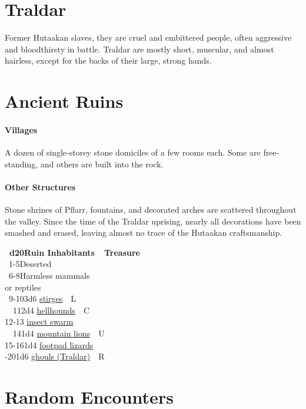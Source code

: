 \documentclass[english,11pt,openany,letterpaper,twocolumn]{book}
\begin{document}
\section{Traldar}

Former Hutaakan slaves, they are cruel and embittered people, often aggressive and bloodthirsty in battle. Traldar are mostly short, muscular, and almost hairless, except for the backs of their large, strong hands.

\section{Ancient Ruins}

\paragraph{Villages}

A dozen of single-storey stone domiciles of a few rooms each. Some are free-standing, and others are built into the rock.

\paragraph{Other Structures}
Stone shrines of Pflarr, fountains, and decorated arches are scattered throughout the valley. Since the time of the Traldar uprising, nearly all decorations have been smashed and erased, leaving almost no trace of the Hutaakan craftsmanship.

\skipline

\ulf\textbf{~d20\tab Ruin Inhabitants~~Treasure}\\
~1-5\tab	Deserted\\
~6-8\tab	Harmless mammals\\
	or reptiles\\
~9-10\tab	3d6 \hyperlink{stirge}{stirges}~~L\\
~~11\tab	2d4 \hyperlink{hellhound}{hellhounds}~~C\\
12-13 \hyperlink{swarm}{insect swarm}\\
~~14\tab	1d4 \hyperlink{lion}{mountain lions}~~U\\
15-16\tab	1d4 \hyperlink{lizard}{footpad lizards}\\
-20\tab	1d6 \hyperlink{ghoul}{ghouls (Traldar)}~~R\\

\break

\section{Random Encounters}
\end{document}
